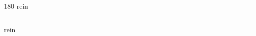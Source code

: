 
\begin{frame}
\begin{center}
\begin{turn}{180}
{\fontsize{2.5cm}{1em}\selectfont rein}
\end{turn}
\vspace{1em}\par  
\hrule
\vspace{1em}\par  
{\fontsize{2.5cm}{1em}\selectfont rein}
\end{center}
\end{frame}
